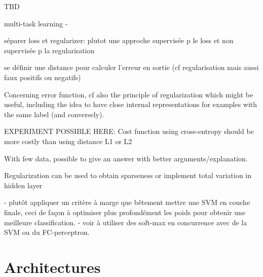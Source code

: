 \documentclass[twocolumn]{article}
\begin{document}
TBD 
\begin{outline}
\1 multi-task learning
\1 - \cite{Le2011optimization}


\1 séparer loss et regularizer: plutot une approche supervisée p le loss et non supervisée p la regularisation

\1  se définir une distance pour calculer l'erreur en sortie (cf regularisation mais aussi faux positifs ou negatifs)  
 
\1 Concerning error function, cf also the principle of regularization which might be useful, including the idea to have close internal representations for examples with the same label (and conversely). 

\1 EXPERIMENT POSSIBLE HERE: Cost function using cross-entropy should be more costly than using distance L1 or L2

\1 With few data, possible to give an answer with better arguments/explanation. 

\1 Regularization can be used to obtain sparseness or implement total variation in hidden layer

\1 - plutôt appliquer un critère à marge que bêtement mettre une SVM en couche finale, ceci de façon à optimiser plus profondément les poids pour obtenir une meilleure classification.
\1 - voir à utiliser des soft-max en concurrence avec de la SVM ou du FC-perceptron.
\end{outline}

\section{Architectures}
\end{document}
